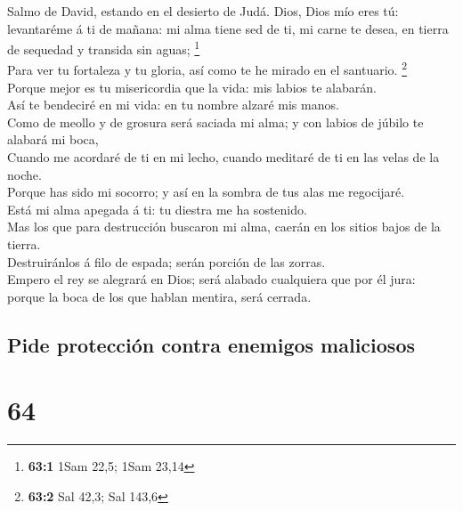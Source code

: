  Salmo de David, estando en el desierto de Judá. Dios,
Dios mío eres tú: levantaréme á ti de mañana: mi alma tiene sed de ti,
mi carne te desea, en tierra de sequedad y transida sin aguas;
\footnote{\textbf{63:1} 1Sam 22,5; 1Sam 23,14}\\
 Para ver tu fortaleza y tu gloria, así como te he mirado
en el santuario. \footnote{\textbf{63:2} Sal 42,3; Sal 143,6}\\
 Porque mejor es tu misericordia que la vida: mis labios
te alabarán.\\
 Así te bendeciré en mi vida: en tu nombre alzaré mis
manos.\\
 Como de meollo y de grosura será saciada mi alma; y con
labios de júbilo te alabará mi boca,\\
 Cuando me acordaré de ti en mi lecho, cuando meditaré de
ti en las velas de la noche.\\
 Porque has sido mi socorro; y así en la sombra de tus
alas me regocijaré.\\
 Está mi alma apegada á ti: tu diestra me ha sostenido.\\
 Mas los que para destrucción buscaron mi alma, caerán en
los sitios bajos de la tierra.\\
 Destruiránlos á filo de espada; serán porción de las
zorras.\\
 Empero el rey se alegrará en Dios; será alabado
cualquiera que por él jura: porque la boca de los que hablan mentira,
será cerrada.

\hypertarget{pide-protecciuxf3n-contra-enemigos-maliciosos}{%
\subsection{Pide protección contra enemigos
maliciosos}\label{pide-protecciuxf3n-contra-enemigos-maliciosos}}

\hypertarget{section-63}{%
\section{64}\label{section-63}}

